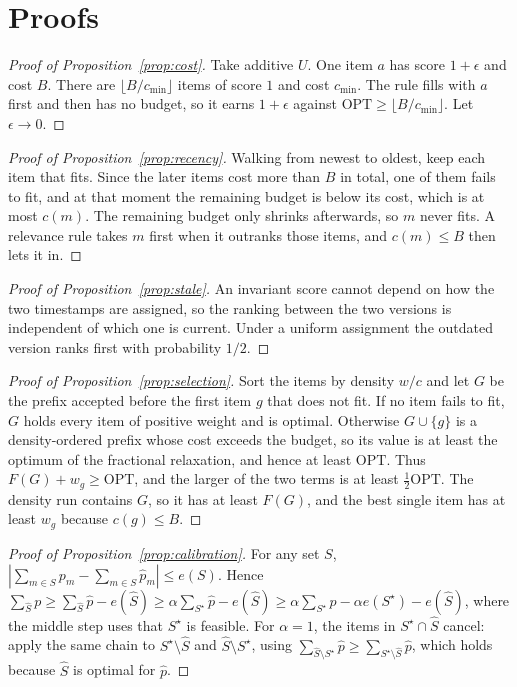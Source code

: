 \section{Proofs}\label{app:proofs}

\begin{proof}[Proof of Proposition~\ref{prop:cost}]
Take additive $U$. One item $a$ has score $1+\epsilon$ and cost $B$. There are $\lfloor B/c_{\min}\rfloor$ items of score $1$ and cost $c_{\min}$. The rule fills with $a$ first and then has no budget, so it earns $1+\epsilon$ against $\mathrm{OPT}\ge\lfloor B/c_{\min}\rfloor$. Let $\epsilon\to0$.
\end{proof}

\begin{proof}[Proof of Proposition~\ref{prop:recency}]
Walking from newest to oldest, keep each item that fits. Since the later items cost more than $B$ in total, one of them fails to fit, and at that moment the remaining budget is below its cost, which is at most $c(m)$. The remaining budget only shrinks afterwards, so $m$ never fits. A relevance rule takes $m$ first when it outranks those items, and $c(m)\le B$ then lets it in.
\end{proof}

\begin{proof}[Proof of Proposition~\ref{prop:stale}]
An invariant score cannot depend on how the two timestamps are assigned, so the ranking between the two versions is independent of which one is current. Under a uniform assignment the outdated version ranks first with probability $1/2$.
\end{proof}

\begin{proof}[Proof of Proposition~\ref{prop:selection}]
Sort the items by density $w/c$ and let $G$ be the prefix accepted before the first item $g$ that does not fit. If no item fails to fit, $G$ holds every item of positive weight and is optimal. Otherwise $G\cup\{g\}$ is a density-ordered prefix whose cost exceeds the budget, so its value is at least the optimum of the fractional relaxation, and hence at least $\mathrm{OPT}$. Thus $F(G)+w_g\ge\mathrm{OPT}$, and the larger of the two terms is at least $\frac12\mathrm{OPT}$. The density run contains $G$, so it has at least $F(G)$, and the best single item has at least $w_g$ because $c(g)\le B$.
\end{proof}

\begin{proof}[Proof of Proposition~\ref{prop:calibration}]
For any set $S$, $|\sum_{m\in S}p_m-\sum_{m\in S}\hat p_m|\le e(S)$. Hence
$\sum_{\hat S}p\ge\sum_{\hat S}\hat p-e(\hat S)\ge\alpha\sum_{S^\star}\hat p-e(\hat S)\ge\alpha\sum_{S^\star}p-\alpha e(S^\star)-e(\hat S)$,
where the middle step uses that $S^\star$ is feasible. For $\alpha=1$, the items in $S^\star\cap\hat S$ cancel: apply the same chain to $S^\star\setminus\hat S$ and $\hat S\setminus S^\star$, using $\sum_{\hat S\setminus S^\star}\hat p\ge\sum_{S^\star\setminus\hat S}\hat p$, which holds because $\hat S$ is optimal for $\hat p$.
\end{proof}


